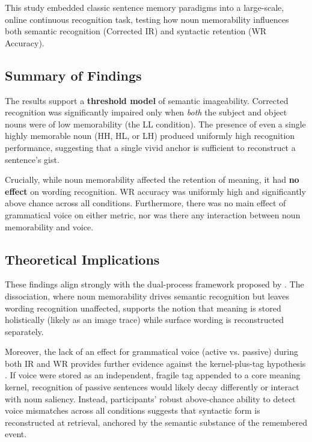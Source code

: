 \documentclass[12pt, a4paper]{article}
\begin{document}
This study embedded classic sentence memory paradigms into a large-scale, online continuous recognition task, testing how noun memorability influences both semantic recognition (Corrected IR) and syntactic retention (WR Accuracy).

\subsection{Summary of Findings}

The results support a \textbf{threshold model} of semantic imageability. Corrected recognition was significantly impaired only when \emph{both} the subject and object nouns were of low memorability (the LL condition). The presence of even a single highly memorable noun (HH, HL, or LH) produced uniformly high recognition performance, suggesting that a single vivid anchor is sufficient to reconstruct a sentence's gist. 

Crucially, while noun memorability affected the retention of meaning, it had \textbf{no effect} on wording recognition. WR accuracy was uniformly high and significantly above chance across all conditions. Furthermore, there was no main effect of grammatical voice on either metric, nor was there any interaction between noun memorability and voice. 

\subsection{Theoretical Implications}

These findings align strongly with the dual-process framework proposed by \citet{begg1971}. The dissociation, where noun memorability drives semantic recognition but leaves wording recognition unaffected, supports the notion that meaning is stored holistically (likely as an image trace) while surface wording is reconstructed separately.

Moreover, the lack of an effect for grammatical voice (active vs. passive) during both IR and WR provides further evidence against the kernel-plus-tag hypothesis \citep{bregman1968}. If voice were stored as an independent, fragile tag appended to a core meaning kernel, recognition of passive sentences would likely decay differently or interact with noun saliency. Instead, participants' robust above-chance ability to detect voice mismatches across all conditions suggests that syntactic form is reconstructed at retrieval, anchored by the semantic substance of the remembered event.
\end{document}
